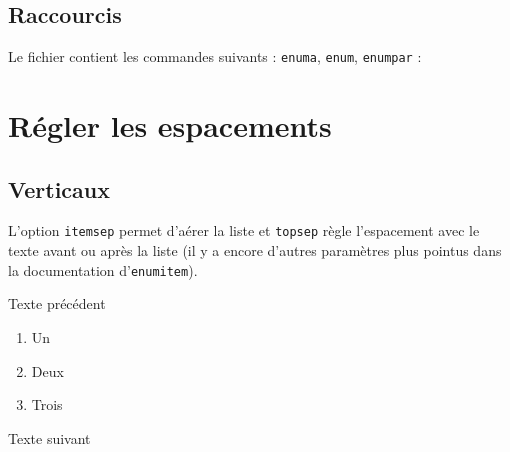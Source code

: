 \subsection*{Raccourcis}

Le fichier  contient les commandes suivants : \texttt{enuma}, \texttt{enum}, \texttt{enumpar} :

\begin{LTXexample}[pos=o]
\end{LTXexample}

\begin{LTXexample}[pos=o]
\end{LTXexample}

\begin{LTXexample}[pos=o]
\end{LTXexample}





\section{Régler les espacements}



\subsection{Verticaux}

L'option \texttt{itemsep} permet d'aérer la liste et \texttt{topsep} règle l'espacement avec le texte avant ou après la liste (il y a encore d'autres paramètres plus pointus dans la documentation d'\texttt{enumitem}).

\begin{LTXexample}[pos=o,width=.4]
Texte précédent
\begin{enumerate}[itemsep=.2cm, topsep=.5cm]
    \item Un
    \item Deux
    \item Trois
\end{enumerate}
Texte suivant
\end{LTXexample}



